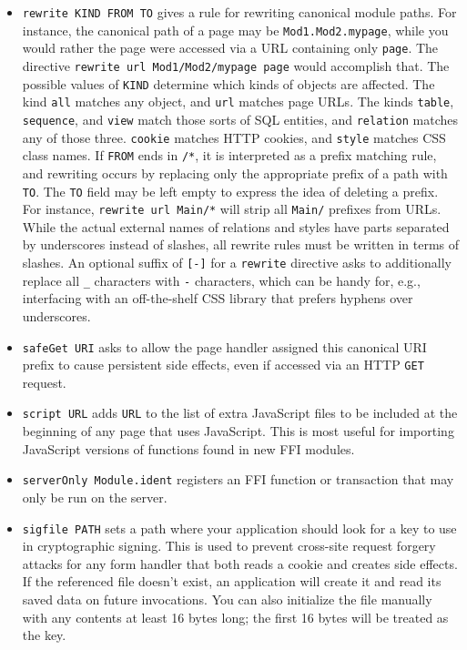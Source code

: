 \documentclass{article}
\newcommand{\cd}[1]{\texttt{#1}}
\begin{document}
\begin{itemize}
\item \texttt{rewrite KIND FROM TO} gives a rule for rewriting canonical module paths.  For instance, the canonical path of a page may be \texttt{Mod1.Mod2.mypage}, while you would rather the page were accessed via a URL containing only \texttt{page}.  The directive \texttt{rewrite url Mod1/Mod2/mypage page} would accomplish that.  The possible values of \texttt{KIND} determine which kinds of objects are affected.  The kind \texttt{all} matches any object, and \texttt{url} matches page URLs.  The kinds \texttt{table}, \texttt{sequence}, and \texttt{view} match those sorts of SQL entities, and \texttt{relation} matches any of those three.  \texttt{cookie} matches HTTP cookies, and \texttt{style} matches CSS class names.  If \texttt{FROM} ends in \texttt{/*}, it is interpreted as a prefix matching rule, and rewriting occurs by replacing only the appropriate prefix of a path with \texttt{TO}.  The \texttt{TO} field may be left empty to express the idea of deleting a prefix.  For instance, \texttt{rewrite url Main/*} will strip all \texttt{Main/} prefixes from URLs.  While the actual external names of relations and styles have parts separated by underscores instead of slashes, all rewrite rules must be written in terms of slashes.  An optional suffix of \cd{[-]} for a \cd{rewrite} directive asks to additionally replace all \cd{\_} characters with \cd{-} characters, which can be handy for, e.g., interfacing with an off-the-shelf CSS library that prefers hyphens over underscores.
\item \texttt{safeGet URI} asks to allow the page handler assigned this canonical URI prefix to cause persistent side effects, even if accessed via an HTTP \cd{GET} request.
\item \texttt{script URL} adds \texttt{URL} to the list of extra JavaScript files to be included at the beginning of any page that uses JavaScript.  This is most useful for importing JavaScript versions of functions found in new FFI modules.
\item \texttt{serverOnly Module.ident} registers an FFI function or transaction that may only be run on the server.
\item \texttt{sigfile PATH} sets a path where your application should look for a key to use in cryptographic signing.  This is used to prevent cross-site request forgery attacks for any form handler that both reads a cookie and creates side effects.  If the referenced file doesn't exist, an application will create it and read its saved data on future invocations.  You can also initialize the file manually with any contents at least 16 bytes long; the first 16 bytes will be treated as the key.

\end{itemize}
\end{document}
